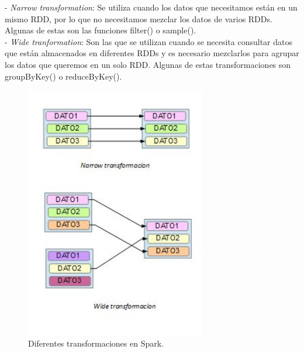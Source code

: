 - \emph{Narrow transformation}: Se utiliza cuando los datos que necesitamos están en un mismo RDD, por lo que no necesitamos mezclar los datos de varios RDDs. Algunas de estas son las funciones filter() o sample().\\

- \emph{Wide tranformation}: Son las que se utilizan cuando se necesita consultar datos que están almacenados en diferentes RDDs y es necesario mezclarlos para agrupar los datos que queremos en un solo RDD. Algunas de estas transformaciones son groupByKey() o reduceByKey().\\

\begin{figure}[H]
	\centering
	\includegraphics[width=0.7\textwidth]{./imagenes/transformaciones_spark}
	\caption{Diferentes transformaciones en Spark.} 
	
\end{figure}

